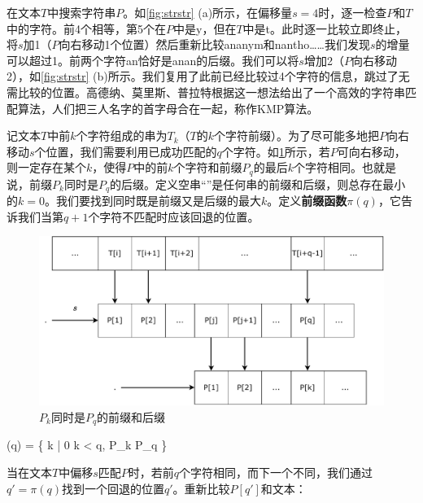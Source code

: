 \documentclass[b5paper]{ctexart}
\begin{document}
 

在文本$T$中搜索字符串$P$。如\cref{fig:strstr} (a)所示，在偏移量$s=4$时，逐一检查$P$和$T$中的字符。前4个相等，第5个在$P$中是y，但在$T$中是t。此时逐一比较立即终止，将$s$加1（$P$向右移动1个位置）然后重新比较ananym和nantho……我们发现$s$的增量可以超过1。前两个字符an恰好是anan的后缀。我们可以将$s$增加2（$P$向右移动2），如\cref{fig:strstr} (b)所示。我们复用了此前已经比较过4个字符的信息，跳过了无需比较的位置。高德纳、莫里斯、普拉特根据这一想法给出了一个高效的字符串匹配算法\cite{kmp}，人们把三人名字的首字母合在一起，称作KMP算法。

记文本$T$中前$k$个字符组成的串为$T_k$（$T$的$k$个字符前缀）。为了尽可能多地把$P$向右移动$s$个位置，我们需要利用已成功匹配的$q$个字符。如\cref{fig:kmp-fallback}所示，若$P$可向右移动，则一定存在某个$k$，使得$P$中的前$k$个字符和前缀$P_q$的最后$k$个字符相同。也就是说，前缀$P_k$同时是$P_q$的后缀。定义空串“”是任何串的前缀和后缀，则总存在最小的$k=0$。我们要找到同时既是前缀又是后缀的最大$k$。定义\textbf{前缀函数}$\pi(q)$，它告诉我们当第$q+1$个字符不匹配时应该回退的位置\cite{CLRS}。

\begin{figure}[htbp]
 \centering
 \includegraphics[scale=0.5]{img/kmp-fallback}
 \caption{$P_k$同时是$P_q$的前缀和后缀}
 \label{fig:kmp-fallback}
\end{figure}

\be
\pi(q) = \max \{ k | 0 \leq k < q,  P_k  P_q \}
\label{eq:prefix-function}
\ee

当在文本$T$中偏移$s$匹配$P$时，若前$q$个字符相同，而下一个不同，我们通过$q' = \pi(q)$找到一个回退的位置$q'$。重新比较$P[q']$和文本：
\end{document}
